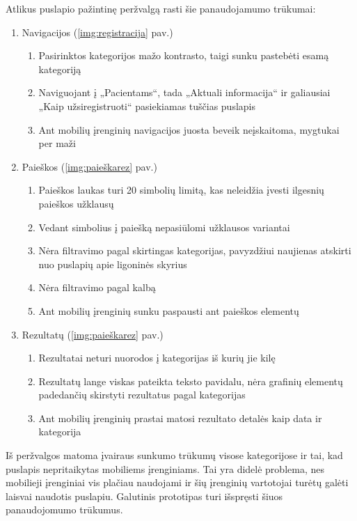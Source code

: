 \documentclass{VUMIFPSkursinis}
\begin{document}
Atlikus puslapio pažintinę peržvalgą rasti šie panaudojamumo trūkumai:
\begin{enumerate}
	\item Navigacijos (\ref{img:registracija} pav.)
	\renewcommand*{\theenumii}{\theenumi.\arabic{enumii}}
	\renewcommand{\labelenumii}{\theenumii}
	\begin{enumerate}
		\item Pasirinktos kategorijos mažo kontrasto, taigi sunku pastebėti esamą kategoriją
		\item Naviguojant į „Pacientams“, tada „Aktuali informacija“ ir galiausiai „Kaip užsiregistruoti“ pasiekiamas tuščias puslapis
		\item Ant mobilių įrenginių navigacijos juosta beveik neįskaitoma, mygtukai per maži
	\end{enumerate}
	\item Paieškos (\ref{img:paieškarez} pav.)
	\renewcommand*{\theenumii}{\theenumi.\arabic{enumii}}
	\renewcommand{\labelenumii}{\theenumii}
	\begin{enumerate}
		\item Paieškos laukas turi 20 simbolių limitą, kas neleidžia įvesti ilgesnių paieškos užklausų
		\item Vedant simbolius į paiešką nepasiūlomi užklausos variantai
		\item Nėra filtravimo pagal skirtingas kategorijas, pavyzdžiui naujienas atskirti nuo puslapių apie ligoninės skyrius
		\item Nėra filtravimo pagal kalbą
		\item Ant mobilių įrenginių sunku paspausti ant paieškos elementų
	\end{enumerate}
	\item Rezultatų (\ref{img:paieškarez} pav.)
	\renewcommand*{\theenumii}{\theenumi.\arabic{enumii}}
	\renewcommand{\labelenumii}{\theenumii}
	\begin{enumerate}
		\item Rezultatai neturi nuorodos į kategorijas iš kurių jie kilę
		\item Rezultatų lange viskas pateikta teksto pavidalu, nėra grafinių elementų padedančių skirstyti rezultatus pagal kategorijas
		\item Ant mobilių įrenginių prastai matosi rezultato detalės kaip data ir kategorija
	\end{enumerate}
\end{enumerate}
\vspace{0,5cm}

Iš peržvalgos matoma įvairaus sunkumo trūkumų visose kategorijose ir tai, kad puslapis nepritaikytas mobiliems įrenginiams. Tai yra didelė problema, nes mobilieji įrenginiai vis plačiau naudojami \cite{EmergingmHealthEn} ir šių įrenginių vartotojai turėtų galėti laisvai naudotis puslapiu. Galutinis prototipas turi išspręsti šiuos panaudojomumo trūkumus.
\end{document}
